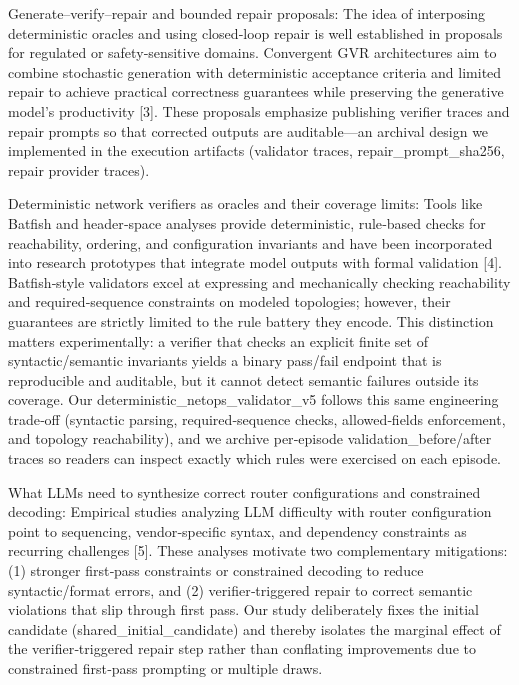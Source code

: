 \documentclass[conference]{IEEEtran}
\begin{document}
Generate--verify--repair and bounded repair proposals: The idea of interposing deterministic oracles and using closed‑loop repair is well established in proposals for regulated or safety‑sensitive domains. Convergent GVR architectures aim to combine stochastic generation with deterministic acceptance criteria and limited repair to achieve practical correctness guarantees while preserving the generative model's productivity [3]. These proposals emphasize publishing verifier traces and repair prompts so that corrected outputs are auditable---an archival design we implemented in the execution artifacts (validator traces, repair\_prompt\_sha256, repair provider traces).

Deterministic network verifiers as oracles and their coverage limits: Tools like Batfish and header‑space analyses provide deterministic, rule‑based checks for reachability, ordering, and configuration invariants and have been incorporated into research prototypes that integrate model outputs with formal validation [4]. Batfish‑style validators excel at expressing and mechanically checking reachability and required‑sequence constraints on modeled topologies; however, their guarantees are strictly limited to the rule battery they encode. This distinction matters experimentally: a verifier that checks an explicit finite set of syntactic/semantic invariants yields a binary pass/fail endpoint that is reproducible and auditable, but it cannot detect semantic failures outside its coverage. Our deterministic\_netops\_validator\_v5 follows this same engineering trade‑off (syntactic parsing, required‑sequence checks, allowed‑fields enforcement, and topology reachability), and we archive per‑episode validation\_before/after traces so readers can inspect exactly which rules were exercised on each episode.

What LLMs need to synthesize correct router configurations and constrained decoding: Empirical studies analyzing LLM difficulty with router configuration point to sequencing, vendor‑specific syntax, and dependency constraints as recurring challenges [5]. These analyses motivate two complementary mitigations: (1) stronger first‑pass constraints or constrained decoding to reduce syntactic/format errors, and (2) verifier‑triggered repair to correct semantic violations that slip through first pass. Our study deliberately fixes the initial candidate (shared\_initial\_candidate) and thereby isolates the marginal effect of the verifier‑triggered repair step rather than conflating improvements due to constrained first‑pass prompting or multiple draws.
\end{document}
